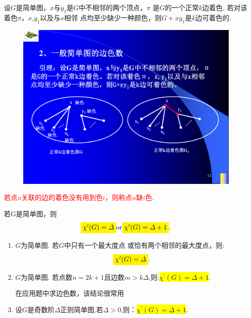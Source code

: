 \begin{lemma}
设$G$是简单图，$x$与$y_1$是$G$中不相邻的两个顶点，$\pi$
是$G$的一个正常$k$边着色. 若对该着色$\pi$，$x$,$y_1$以及与$x$相邻
点均至少缺少一种颜色，则$G+xy_1$是$k$边可着色的.
\end{lemma}
\begin{figure}[H]
	\small
	\centering 
	\includegraphics[scale=0.6]{image/CH7_bianzhuose.pdf}  
	\label{figkk1ik}  
\end{figure}
\begin{note}
\textcolor{red}{若点$u$关联的边的着色没有用到色$i$，则称点$u$缺$i$色}.
\end{note}
\begin{theorem}[维津定理，1964]
	若G是简单图，则 
	\[
	\colorbox{yellow}{$\chi^{\prime}(G)= \varDelta$} \mbox{or}\colorbox{yellow}{$ \chi^{\prime}(G)= \varDelta+1$}.
	\]
\end{theorem}
\begin{corollary}
	\begin{enumerate}
		\item $G$为简单图. 若$G$中只有一个最大度点
		或恰有两个相邻的最大度点，则:
		\[
		\colorbox{yellow}{$\chi^{\prime}(G)= \varDelta$}.
		\]
		\item $G$为简单图. 若点数$n=2k+1$且边数$m>k\varDelta$,则:\colorbox{yellow}{$\chi^{\prime}(G)= \varDelta+1$}.
		\begin{note}
			在应用题中求边色数，该结论很常用
		\end{note}
		\item 设$G$是奇数阶$\varDelta$正则简单图,若$\varDelta>0$,则：\colorbox{yellow}{$\chi^{\prime}(G)= \varDelta+1$}.
\end{enumerate}
\end{corollary}
